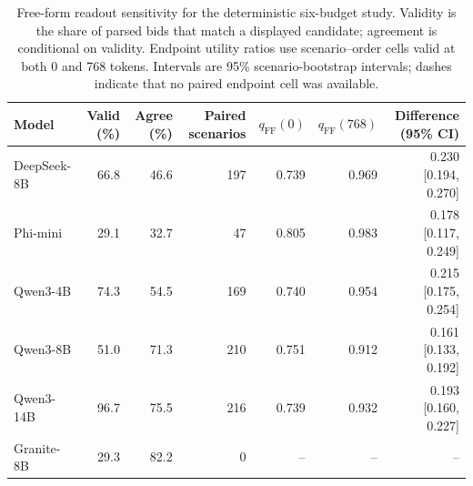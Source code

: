 \begin{table}[H]
\centering
\caption{Free-form readout sensitivity for the deterministic six-budget study. Validity is the share of parsed bids that match a displayed candidate; agreement is conditional on validity. Endpoint utility ratios use scenario--order cells valid at both 0 and 768 tokens. Intervals are 95\% scenario-bootstrap intervals; dashes indicate that no paired endpoint cell was available.}
\label{tab:freeformsensitivity}
\scriptsize
\setlength{\tabcolsep}{3pt}
\begin{tabular}{lrrrrrr}
\toprule
Model & Valid (\%) & Agree (\%) & Paired scenarios & $q_{\mathrm{FF}}(0)$ & $q_{\mathrm{FF}}(768)$ & Difference (95\% CI) \\
\midrule
DeepSeek-8B & 66.8 & 46.6 & 197 & 0.739 & 0.969 & 0.230 [0.194, 0.270] \\
Phi-mini & 29.1 & 32.7 & 47 & 0.805 & 0.983 & 0.178 [0.117, 0.249] \\
Qwen3-4B & 74.3 & 54.5 & 169 & 0.740 & 0.954 & 0.215 [0.175, 0.254] \\
Qwen3-8B & 51.0 & 71.3 & 210 & 0.751 & 0.912 & 0.161 [0.133, 0.192] \\
Qwen3-14B & 96.7 & 75.5 & 216 & 0.739 & 0.932 & 0.193 [0.160, 0.227] \\
Granite-8B & 29.3 & 82.2 & 0 & -- & -- & -- \\
\bottomrule
\end{tabular}
\end{table}
